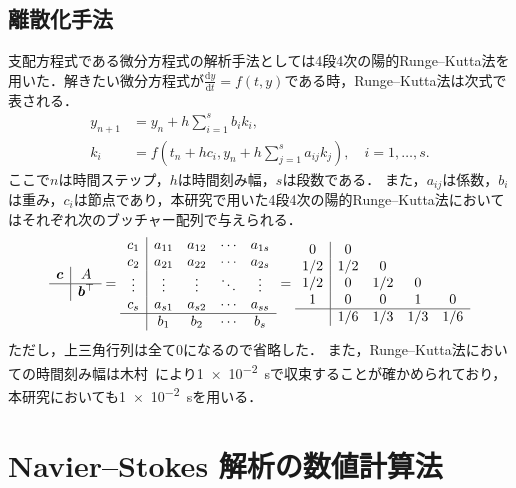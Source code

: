 \subsection{離散化手法}
支配方程式である微分方程式の解析手法としては4段4次の陽的Runge–Kutta法を用いた．解きたい微分方程式が$\frac{\mathrm{d}y}{\mathrm{d}t} = f(t,y)$である時，Runge–Kutta法は次式で表される．
\begin{align}
    \label{eq:runge-kutta}
    y_{n+1} &= y_n + h\sum^s_{i=1}b_ik_i, \\
    k_i &= f\left(t_n + hc_i, y_n + h\sum_{j=1}^s a_{ij} k_j\right), \quad i = 1,\ldots,s.
\end{align}
ここで$n$は時間ステップ，$h$は時間刻み幅，$s$は段数である．
また，$a_{ij}$は係数，$b_i$は重み，$c_i$は節点であり，本研究で用いた4段4次の陽的Runge–Kutta法においてはそれぞれ次のブッチャー配列で与えられる．
\begin{equation}
    \begin{array}{c|c} \bm c & A \\ \hline & \bm b^\top \end{array} =
    \begin{array}{c|ccccc} c_1 & a_{11} & a_{12} & \cdots & a_{1s} \\ c_2 & a_{21} & a_{22} & \cdots & a_{2s} \\ \vdots & \vdots & \vdots & \ddots & \vdots \\ c_s & a_{s1} & a_{s2} & \cdots & a_{ss} \\ \hline & b_1 & b_2 & \cdots & b_s \end{array} =
    \begin{array}{c|cccc} 0 & 0 \\ 1/2 & 1/2 & 0 \\ 1/2 & 0 & 1/2 & 0 \\ 1 & 0 & 0 & 1 & 0 \\ \hline & 1/6 & 1/3 & 1/3 & 1/6 \end{array}
\end{equation}
ただし，上三角行列は全て0になるので省略した．
また，Runge–Kutta法においての時間刻み幅は木村~\cite{kimura2018master}により\SI{1e-2}{s}で収束することが確かめられており，本研究においても\SI{1e-2}{s}を用いる．


\newpage
\section{Navier–Stokes 解析の数値計算法}
